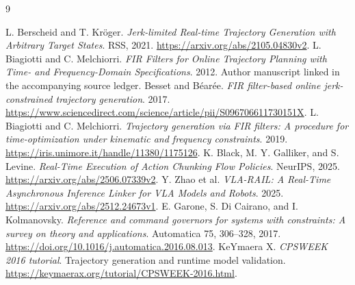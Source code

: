 \documentclass[11pt,letterpaper]{article}
\begin{document}
\newpage
\begin{thebibliography}{9}\small\raggedright
{} L. Berscheid and T. Kr\"oger.
\emph{Jerk-limited Real-time Trajectory Generation with Arbitrary Target States}.
RSS, 2021. \url{https://arxiv.org/abs/2105.04830v2}.
 L. Biagiotti and C. Melchiorri.
\emph{FIR Filters for Online Trajectory Planning with Time- and Frequency-Domain Specifications}. 2012. Author manuscript linked in the accompanying source ledger.
 Besset and B\'ear\'ee.
\emph{FIR filter-based online jerk-constrained trajectory generation}. 2017.
\url{https://www.sciencedirect.com/science/article/pii/S096706611730151X}.
 L. Biagiotti and C. Melchiorri.
\emph{Trajectory generation via FIR filters: A procedure for time-optimization under kinematic and frequency constraints}. 2019.
\url{https://iris.unimore.it/handle/11380/1175126}.
 K. Black, M. Y. Galliker, and S. Levine.
\emph{Real-Time Execution of Action Chunking Flow Policies}. NeurIPS, 2025.
\url{https://arxiv.org/abs/2506.07339v2}.
 Y. Zhao et al.
\emph{VLA-RAIL: A Real-Time Asynchronous Inference Linker for VLA Models and Robots}. 2025.
\url{https://arxiv.org/abs/2512.24673v1}.
 E. Garone, S. Di Cairano, and I. Kolmanovsky.
\emph{Reference and command governors for systems with constraints: A survey on theory and applications}.
Automatica 75, 306--328, 2017. \url{https://doi.org/10.1016/j.automatica.2016.08.013}.
 KeYmaera X.
\emph{CPSWEEK 2016 tutorial}. Trajectory generation and runtime model validation.
\url{https://keymaerax.org/tutorial/CPSWEEK-2016.html}.
\end{thebibliography}
\end{document}
